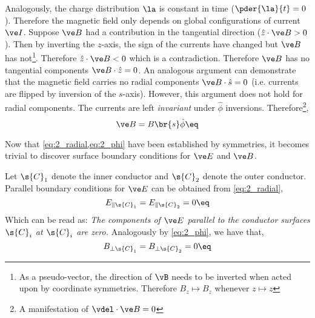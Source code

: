 \documentclass{article}
\begin{document}
Analogously, the charge distribution $\la$ is constant in time ($\pder{\la}{t} = 0$). Therefore the magnetic field only depends on global configurations of current $\ve I$. Suppose $\ve B$ had a contribution in the tangential direction ($\hat{z} \cdot \ve B > 0$). Then by inverting the $z$-axis, the sign of the currents have changed but $\ve B$ has not\footnote{As a pseudo-vector, the direction of $\vB$ needs to be inverted when acted upon by coordinate symmetries. Therefore $B_z \mapsto B_z$ whenever $z \mapsto z$}. Therefore $\hat{z} \cdot \ve B < 0$ which is a contradiction. Therefore $\ve B$ has no tangential components $\ve B \cdot \hat{z} = 0$. An analogous argument can demonstrate that the magnetic field carries no radial components $\ve B \cdot \hat{s} = 0$ (i.e. currents are flipped by inversion of the $s$-axis). However, this argument does not hold for radial components. The currents are left \textit{invariant} under $\hat{\phi}$ inversions. Therefore\footnote{A manifestation of $\vdel \cdot \ve B = 0$},
\[ \ve B = B\br{s} \hat{\phi} \eq \label{eq:2_phi}\]

Now that \cref{eq:2_radial,eq:2_phi} have been established by symmetries, it becomes trivial to discover surface boundary conditions for $\ve E$ and $\ve B$.

Let $\s{C}_1$ denote the inner conductor and $\s{C}_2$ denote the outer conductor. Parallel boundary conditions for $\ve E$ can be obtained from \cref{eq:2_radial},
\[ E_{\parallel \s{C}_1} = E_{\parallel \s{C}_2} = 0 \eq \label{eq:e_boundary_1}\]
Which can be read as: \textit{The components of $\ve E$ parallel to the conductor surfaces $\s{C}_i$ at $\s{C}_i$ are zero.} Analogously by \cref{eq:2_phi}, we have that,
\[ B_{\perp \s{C}_1} = B_{\perp \s{C}_2} = 0 \eq \label{eq:b_boundary_1} \]
\end{document}

